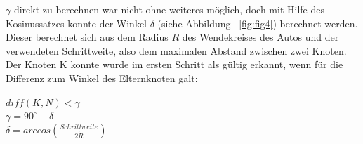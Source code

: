  $\gamma$ direkt zu berechnen war nicht ohne weiteres möglich, doch mit Hilfe des Kosinussatzes konnte der Winkel $\delta$ (siehe Abbildung ~\ref{fig:fig4}) berechnet werden. Dieser berechnet sich aus dem Radius $R$ des Wendekreises des Autos und der verwendeten Schrittweite, also dem maximalen Abstand zwischen zwei Knoten. \\
Der Knoten K konnte wurde im ersten Schritt als gültig erkannt, wenn für die Differenz zum Winkel des Elternknoten galt: 
\begin{center}
$diff(K,N) <\gamma$ \\
$\gamma = 90^{\circ} - \delta$  \\
$\delta = arccos (\frac{Schrittweite}{2 \dot R})$  \\
\end{center}


